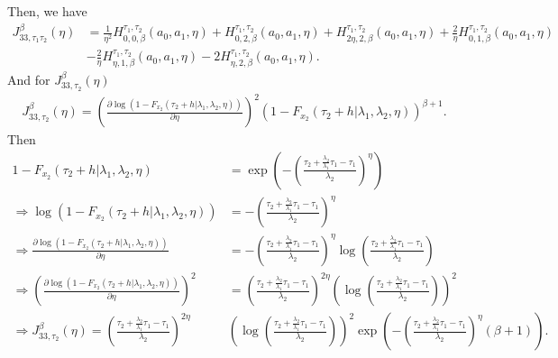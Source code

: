 \documentclass{article}
\begin{document}
Then, we have
\begin{align*}
J_{33,\tau_1\tau_2}^{\beta}(\eta)&=\frac{1}{\eta^2}H_{0,0,\beta}^{\tau_1,\tau_2}(a_0,a_1,\eta)+H_{0,2,\beta}^{\tau_1,\tau_2}(a_0,a_1,\eta)+H_{2\eta,2,\beta}^{\tau_1,\tau_2}(a_0,a_1,\eta)+\frac{2}{\eta}H_{0,1,\beta}^{\tau_1,\tau_2}(a_0,a_1,\eta)
\\
&-\frac{2}{\eta}H_{\eta,1,\beta}^{\tau_1,\tau_2}(a_0,a_1,\eta)-2H_{\eta,2,\beta}^{\tau_1,\tau_2}(a_0,a_1,\eta).
\end{align*}
And for $J_{33,\tau_2}^{\beta}(\eta)$
\begin{align*}
J_{33,\tau_2}^{\beta}(\eta)=\left(\frac{\partial \log\left(1-F_{x_2}(\tau_2+h|\lambda_1,\lambda_2,\eta)\right)}{\partial \eta}\right)^2\left(1-F_{x_2}(\tau_2+h|\lambda_1,\lambda_2,\eta)\right)^{\beta+1}.
\end{align*}
Then
\begin{align}
1-F_{x_2}(\tau_2+h|\lambda_1,\lambda_2,\eta)&=\exp\left(-\left(\frac{\tau_2+\frac{\lambda_2}{\lambda_1}\tau_1-\tau_1}{\lambda_2}\right)^{\eta}\right) \nonumber
\\
\Rightarrow \log\left(1-F_{x_2}(\tau_2+h|\lambda_1,\lambda_2,\eta)\right)&=-\left(\frac{\tau_2+\frac{\lambda_2}{\lambda_1}\tau_1-\tau_1}{\lambda_2}\right)^{\eta} \nonumber
\\
\Rightarrow \frac{\partial \log\left(1-F_{x_2}(\tau_2+h|\lambda_1,\lambda_2,\eta)\right)}{\partial \eta}&=-\left(\frac{\tau_2+\frac{\lambda_2}{\lambda_1}\tau_1-\tau_1}{\lambda_2}\right)^{\eta}\log\left(\frac{\tau_2+\frac{\lambda_2}{\lambda_1}\tau_1-\tau_1}{\lambda_2}\right) \nonumber
\\
\Rightarrow \left( \frac{\partial \log\left(1-F_{x_2}(\tau_2+h|\lambda_1,\lambda_2,\eta)\right)}{\partial \eta}\right)^2&=\left(\frac{\tau_2+\frac{\lambda_2}{\lambda_1}\tau_1-\tau_1}{\lambda_2}\right)^{2\eta}\left(\log\left(\frac{\tau_2+\frac{\lambda_2}{\lambda_1}\tau_1-\tau_1}{\lambda_2}\right)\right)^2 \nonumber
\\
\Rightarrow J_{33,\tau_2}^{\beta}(\eta)=\left(\frac{\tau_2+\frac{\lambda_2}{\lambda_1}\tau_1-\tau_1}{\lambda_2}\right)^{2\eta}&\left(\log\left(\frac{\tau_2+\frac{\lambda_2}{\lambda_1}\tau_1-\tau_1}{\lambda_2}\right)\right)^2\exp\left(-\left(\frac{\tau_2+\frac{\lambda_2}{\lambda_1}\tau_1-\tau_1}{\lambda_2}\right)^\eta(\beta+1)\right) .
\label{eq:dev_F2_eta}
\end{align}
\end{document}
